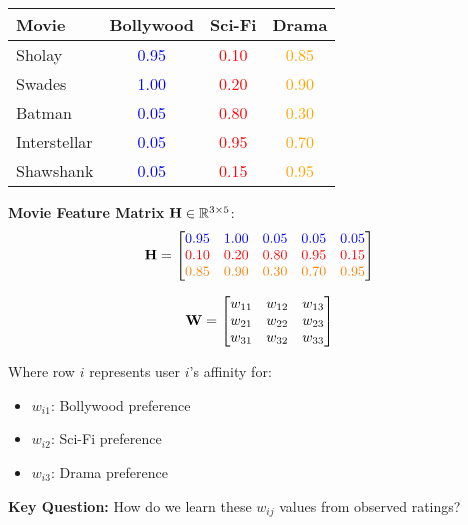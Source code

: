 \documentclass{beamer}
\begin{document}
\begin{frame}\begin{center}
\renewcommand{\arraystretch}{1.3}
\begin{tabular}{l|ccc}
\toprule
\textbf{Movie} & \textbf{Bollywood} & \textbf{Sci-Fi} & \textbf{Drama} \\
\midrule
Sholay & \textcolor{blue}{0.95} & \textcolor{red}{0.10} & \textcolor{orange}{0.85} \\
Swades & \textcolor{blue}{1.00} & \textcolor{red}{0.20} & \textcolor{orange}{0.90} \\
Batman & \textcolor{blue}{0.05} & \textcolor{red}{0.80} & \textcolor{orange}{0.30} \\
Interstellar & \textcolor{blue}{0.05} & \textcolor{red}{0.95} & \textcolor{orange}{0.70} \\
Shawshank & \textcolor{blue}{0.05} & \textcolor{red}{0.15} & \textcolor{orange}{0.95} \\
\bottomrule
\end{tabular}
\end{center}

\pause
\textbf{Movie Feature Matrix} $\mathbf{H} \in \mathbb{R}^{3 \times 5}$:
\begin{equation*}
\mathbf{H} = \begin{bmatrix}
\textcolor{blue}{0.95} & \textcolor{blue}{1.00} & \textcolor{blue}{0.05} & \textcolor{blue}{0.05} & \textcolor{blue}{0.05} \\
\textcolor{red}{0.10} & \textcolor{red}{0.20} & \textcolor{red}{0.80} & \textcolor{red}{0.95} & \textcolor{red}{0.15} \\
\textcolor{orange}{0.85} & \textcolor{orange}{0.90} & \textcolor{orange}{0.30} & \textcolor{orange}{0.70} & \textcolor{orange}{0.95}
\end{bmatrix}
\end{equation*}
\end{frame}

\begin{frame}\begin{equation*}
\mathbf{W} = \begin{bmatrix}
w_{11} & w_{12} & w_{13} \\
w_{21} & w_{22} & w_{23} \\
w_{31} & w_{32} & w_{33}
\end{bmatrix}
\end{equation*}

\pause
Where row $i$ represents user $i$'s affinity for:
\begin{itemize}
\item $w_{i1}$: Bollywood preference
    \item $w_{i2}$: Sci-Fi preference  
    \pause
\item $w_{i3}$: Drama preference
\end{itemize}

\pause
\textbf{Key Question:} How do we learn these $w_{ij}$ values from observed ratings?
\end{frame}
\end{document}
